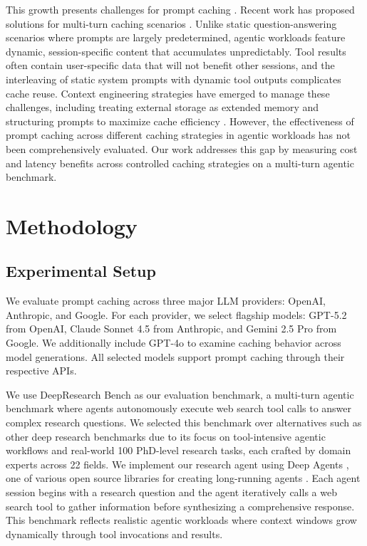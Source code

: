 \documentclass{article}
\theoremstyle{plain}
\theoremstyle{definition}
\theoremstyle{remark}
\begin{document}
This growth presents challenges for prompt caching \citep{multiturn_survey2025,laban2025llmslostmultiturnconversation}. Recent work has proposed solutions for multi-turn caching scenarios \citep{flashgen2025, yan2025contextcachecontextawaresemanticcache}. Unlike static question-answering scenarios where prompts are largely predetermined, agentic workloads feature dynamic, session-specific content that accumulates unpredictably. Tool results often contain user-specific data that will not benefit other sessions, and the interleaving of static system prompts with dynamic tool outputs complicates cache reuse. Context engineering strategies have emerged to manage these challenges, including treating external storage as extended memory and structuring prompts to maximize cache efficiency \citep{ji2025manus_context_engineering,lumer2025toolagentselectionsurvey}. However, the effectiveness of prompt caching across different caching strategies in agentic workloads has not been comprehensively evaluated. Our work addresses this gap by measuring cost and latency benefits across controlled caching strategies on a multi-turn agentic benchmark.

\section{Methodology}
\label{sec:methodology}

\subsection{Experimental Setup}
\label{subsec:experimental_setup}

We evaluate prompt caching across three major LLM providers: OpenAI, Anthropic, and Google. For each provider, we select flagship models: GPT-5.2 from OpenAI, Claude Sonnet 4.5 from Anthropic, and Gemini 2.5 Pro from Google. We additionally include GPT-4o to examine caching behavior across model generations. All selected models support prompt caching through their respective APIs.

We use DeepResearch Bench \citep{du2025deepresearchbenchcomprehensivebenchmark} as our evaluation benchmark, a multi-turn agentic benchmark where agents autonomously execute web search tool calls to answer complex research questions. We selected this benchmark over alternatives such as other deep research benchmarks \citep{bosse2025deepresearchbench_futuresearch, li2025reportbench} due to its focus on tool-intensive agentic workflows and real-world 100 PhD-level research tasks, each crafted by domain experts across 22 fields. We implement our research agent using Deep Agents \citep{langchain2025deepagents}, one of various open source libraries for creating long-running agents \cite{anthropic2025claudeagentsdk,openai2025agentssdk,google2025adk,microsoft2023autogen,microsoft2026agentframework,microsoft2023semantickernel,crewai2023crewai,llamaindex2022llamaindex,huggingface2024smolagents,openai2024swarm,agno2026agno}. Each agent session begins with a research question and the agent iteratively calls a web search tool to gather information before synthesizing a comprehensive response. This benchmark reflects realistic agentic workloads where context windows grow dynamically through tool invocations and results.
\end{document}
